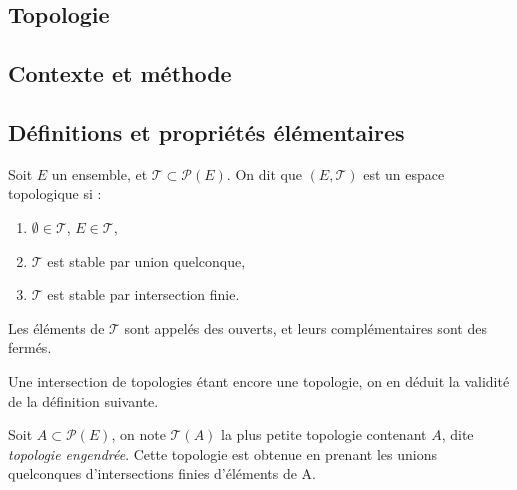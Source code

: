 \documentclass[12pt,a4paper]{article}
\begin{document}
\newpage
\begin{center}  
\section*{Topologie} 
\end{center}




\subsection*{Contexte et méthode}


\subsection*{Définitions et propriétés élémentaires}
\begin{definstar}
Soit $E$ un ensemble, et $\mathcal{T} \subset \mathcal{P}(E)$.  On dit que $(E,\mathcal{T})$ est un espace topologique si :
\begin{enumerate}
\item $\emptyset \in \mathcal{T}$, $E \in \mathcal{T}$,
\item $\mathcal{T}$ est stable par union quelconque,
\item $\mathcal{T}$ est stable par intersection finie.
\end{enumerate}
Les éléments de $\mathcal{T}$ sont appelés des ouverts, et leurs complémentaires sont des fermés.
\end{definstar}
\begin{rmq}
Une intersection de topologies étant encore une topologie, on en déduit la validité de la définition suivante.
\end{rmq}
\begin{definstar}
Soit $A \subset \mathcal{P}(E)$, on note $\mathcal{T}(A)$ la plus petite topologie contenant $A$, dite \textit{topologie engendrée}. Cette topologie est obtenue en prenant les unions quelconques d'intersections finies
d'éléments de A.
\end{definstar}
\end{document}
